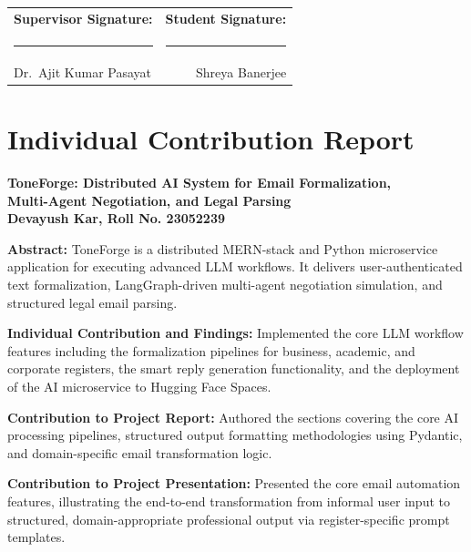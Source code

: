 \documentclass[12pt,a4paper]{report}
\begin{document}
\vspace{2cm}
\noindent
\begin{tabular*}{\textwidth}{@{\extracolsep{\fill}}lr}
	\textbf{Supervisor Signature:} & \textbf{Student Signature:} \\[1.8cm]
	\rule{6cm}{0.4pt} & \rule{6cm}{0.4pt} \\
	Dr.\ Ajit Kumar Pasayat & Shreya Banerjee \\
\end{tabular*}

\clearpage
\chapter*{Individual Contribution Report}
\begin{center}
	{\large \textbf{ToneForge: Distributed AI System for Email Formalization,\\Multi-Agent Negotiation, and Legal Parsing}}\\[0.5cm]
	{\large \textbf{Devayush Kar, Roll No. 23052239}}\\[0.2cm]
\end{center}

\vspace{0.5cm}
\noindent \textbf{Abstract:}
ToneForge is a distributed MERN-stack and Python microservice application for executing advanced LLM workflows. It delivers user-authenticated text formalization, LangGraph-driven multi-agent negotiation simulation, and structured legal email parsing.

\vspace{0.5cm}
\noindent \textbf{Individual Contribution and Findings:}
Implemented the core LLM workflow features including the formalization pipelines for business, academic, and corporate registers, the smart reply generation functionality, and the deployment of the AI microservice to Hugging Face Spaces.

\vspace{0.5cm}
\noindent \textbf{Contribution to Project Report:}
Authored the sections covering the core AI processing pipelines, structured output formatting methodologies using Pydantic, and domain-specific email transformation logic.

\vspace{0.5cm}
\noindent \textbf{Contribution to Project Presentation:}
Presented the core email automation features, illustrating the end-to-end transformation from informal user input to structured, domain-appropriate professional output via register-specific prompt templates.
\end{document}
